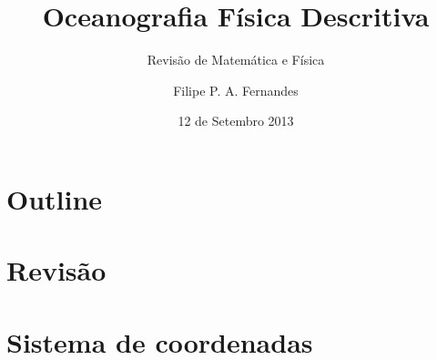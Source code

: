 \title[Aula 04]{Oceanografia Física Descritiva}
\subtitle{Revisão de Matemática e Física}
\author[Filipe Fernandes]{Filipe P. A. Fernandes}
\date[Setembro 2013]{12 de Setembro 2013}




\begin{frame}[plain]
  \titlepage
\end{frame}

\section*{Outline}
\begin{frame}
\tableofcontents
\end{frame}

\section{Revisão}
\section{Sistema de coordenadas}

